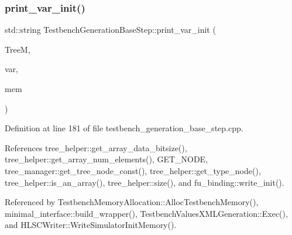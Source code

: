 \subsubsection{\texorpdfstring{print\+\_\+var\+\_\+init()}{print\_var\_init()}}
{\footnotesize\ttfamily std\+::string Testbench\+Generation\+Base\+Step\+::print\+\_\+var\+\_\+init (\begin{DoxyParamCaption}\item[{const \hyperlink{tree__manager_8hpp_a792e3f1f892d7d997a8d8a4a12e39346}{tree\+\_\+manager\+Const\+Ref}}]{TreeM,  }\item[{unsigned int}]{var,  }\item[{const \hyperlink{memory_8hpp_aec1333ec6cd561731fb3ed3e55b9caf5}{memory\+Ref}}]{mem }\end{DoxyParamCaption})\hspace{0.3cm}{\ttfamily [static]}}



Definition at line 181 of file testbench\+\_\+generation\+\_\+base\+\_\+step.\+cpp.



References tree\+\_\+helper\+::get\+\_\+array\+\_\+data\+\_\+bitsize(), tree\+\_\+helper\+::get\+\_\+array\+\_\+num\+\_\+elements(), G\+E\+T\+\_\+\+N\+O\+DE, tree\+\_\+manager\+::get\+\_\+tree\+\_\+node\+\_\+const(), tree\+\_\+helper\+::get\+\_\+type\+\_\+node(), tree\+\_\+helper\+::is\+\_\+an\+\_\+array(), tree\+\_\+helper\+::size(), and fu\+\_\+binding\+::write\+\_\+init().



Referenced by Testbench\+Memory\+Allocation\+::\+Alloc\+Testbench\+Memory(), minimal\+\_\+interface\+::build\+\_\+wrapper(), Testbench\+Values\+X\+M\+L\+Generation\+::\+Exec(), and H\+L\+S\+C\+Writer\+::\+Write\+Simulator\+Init\+Memory().

